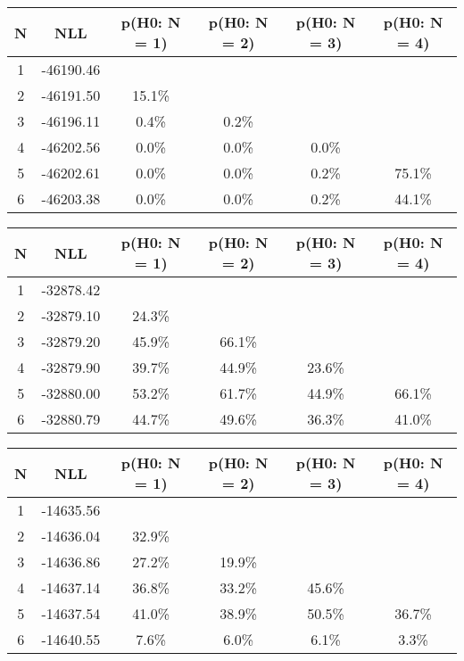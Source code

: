 \begin{table}[htb]
	\begin{center}
{\footnotesize\renewcommand{\arraystretch}{1.4}
		\begin{tabular}{cc||cccc}
			N & NLL & p(H0: N = 1) & p(H0: N = 2) & p(H0: N = 3) & p(H0: N = 4)\\ 
		\hline
1 & -46190.46 & & & & \\
2 & -46191.50 & 15.1\% & & & \\
3 & -46196.11 & 0.4\% & 0.2\% & & \\
4 & -46202.56 & 0.0\% & 0.0\% & 0.0\% & \\
5 & -46202.61 & 0.0\% & 0.0\% & 0.2\% & 75.1\% \\
6 & -46203.38 & 0.0\% & 0.0\% & 0.2\% & 44.1\% \\
	\end{tabular}
		\label{tab:lab}
	}
	\end{center}\end{table}

\begin{table}[htb]
	\begin{center}
{\footnotesize\renewcommand{\arraystretch}{1.4}
		\begin{tabular}{cc||cccc}
			N & NLL & p(H0: N = 1) & p(H0: N = 2) & p(H0: N = 3) & p(H0: N = 4)\\ 
		\hline
1 & -32878.42 & & & & \\
2 & -32879.10 & 24.3\% & & & \\
3 & -32879.20 & 45.9\% & 66.1\% & & \\
4 & -32879.90 & 39.7\% & 44.9\% & 23.6\% & \\
5 & -32880.00 & 53.2\% & 61.7\% & 44.9\% & 66.1\% \\
6 & -32880.79 & 44.7\% & 49.6\% & 36.3\% & 41.0\% \\
	\end{tabular}
		\label{tab:lab}
	}
	\end{center}\end{table}

\begin{table}[htb]
	\begin{center}
{\footnotesize\renewcommand{\arraystretch}{1.4}
		\begin{tabular}{cc||cccc}
			N & NLL & p(H0: N = 1) & p(H0: N = 2) & p(H0: N = 3) & p(H0: N = 4)\\ 
		\hline
1 & -14635.56 & & & & \\
2 & -14636.04 & 32.9\% & & & \\
3 & -14636.86 & 27.2\% & 19.9\% & & \\
4 & -14637.14 & 36.8\% & 33.2\% & 45.6\% & \\
5 & -14637.54 & 41.0\% & 38.9\% & 50.5\% & 36.7\% \\
6 & -14640.55 & 7.6\% & 6.0\% & 6.1\% & 3.3\% \\
	\end{tabular}
		\label{tab:lab}
	}
	\end{center}\end{table}

